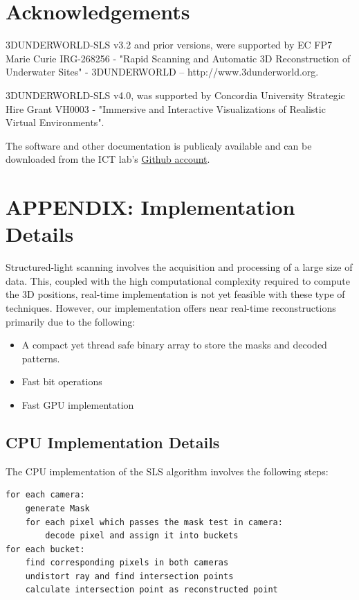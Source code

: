 \documentclass[final,12pt,3p]{elsarticle}
\begin{document}
\section*{Acknowledgements}
3DUNDERWORLD-SLS v3.2 and prior versions, were supported by EC FP7 Marie Curie IRG-268256 - "Rapid Scanning and Automatic 3D Reconstruction of Underwater Sites" - 3DUNDERWORLD – http://www.3dunderworld.org. 

3DUNDERWORLD-SLS v4.0, was supported by Concordia University Strategic Hire Grant VH0003 - "Immersive and Interactive Visualizations of Realistic Virtual Environments".

The software and other documentation is publicaly available and can be downloaded from the ICT lab's \hyperlink{https://github.com/theICTlab/3DUNDERWORLD-Structured-Light-Scanner}{Github account}.


\section{APPENDIX: Implementation Details}
Structured-light scanning involves the acquisition and processing of a large size of data. This, coupled with the high computational complexity required to compute the 3D positions, real-time implementation is not yet feasible with these type of techniques. However, our implementation offers near real-time reconstructions primarily due to the following:
\begin{itemize}
\item A compact yet thread safe binary array to store the masks and decoded patterns.
\item
  Fast bit operations
\item
  Fast GPU implementation
\end{itemize}

\subsection{CPU Implementation Details}\label{implementation-details-on-cpu}
The CPU implementation of the SLS algorithm involves the following steps:
\begin{verbatim}
for each camera:
    generate Mask
    for each pixel which passes the mask test in camera:
        decode pixel and assign it into buckets
for each bucket:
    find corresponding pixels in both cameras
    undistort ray and find intersection points
    calculate intersection point as reconstructed point
\end{verbatim}
\end{document}
